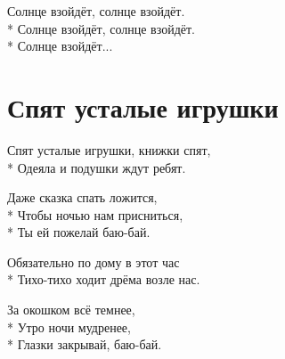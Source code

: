 \medskip

\begin{minipage}{\linewidth}
Солнце взойдёт, солнце взойдёт.\\*
Солнце взойдёт, солнце взойдёт.\\*
Солнце взойдёт...\\
\end{minipage}

\vspace{\fill}\newpage

\section{Спят усталые игрушки}
\label{song:Спят_усталые_игрушки}

\medskip

\begin{minipage}{\linewidth}
Спят усталые игрушки, книжки спят,\\*
Одеяла и подушки ждут ребят.\\
\end{minipage}\par\medskip\nobreak

\medskip

\begin{minipage}{\linewidth}
\hspace*{1.5em}Даже сказка спать ложится,\\*
\hspace*{1.5em}Чтобы ночью нам присниться,\\*
\hspace*{1.5em}Ты ей пожелай баю-бай.\\
\end{minipage}\par\medskip\nobreak

\medskip

\begin{minipage}{\linewidth}
Обязательно по дому в этот час\\*
Тихо-тихо ходит дрёма возле нас.\\
\end{minipage}\par\medskip\nobreak

\medskip

\begin{minipage}{\linewidth}
\hspace*{1.5em}За окошком всё темнее,\\*
\hspace*{1.5em}Утро ночи мудренее,\\*
\hspace*{1.5em}Глазки закрывай, баю-бай.\\
\end{minipage}\par\medskip\nobreak

